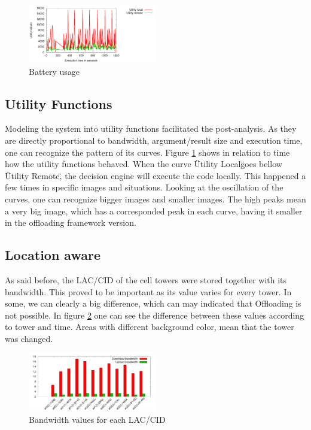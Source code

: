 \documentclass[10pt, conference, letterpaper]{IEEEtran}
\begin{document}
\begin{figure}[!t]
  \centering
  \includegraphics[width=0.5\textwidth]{results/plots/utility-fluctuation/executions.png}
  \caption{Battery usage}
  \label{fig:utilityplot}
\end{figure}

  \subsection{Utility Functions}
  Modeling the system into utility functions facilitated the post-analysis. As they are directly proportional to bandwidth, argument/result size and execution time, one can recognize the pattern of its curves. Figure \ref{fig:utilityplot} shows in relation to time how the utility functions behaved. When the curve \"Utility Local\" goes bellow \"Utility Remote\", the decision engine will execute the code locally. This happened a few times in specific images and situations. Looking at the oscillation of the curves, one can recognize bigger images and smaller images. The high peaks mean a very big image, which has a corresponded peak in each curve, having it smaller in the offloading framework version. 

  \subsection{Location aware}
  As said before, the LAC/CID of the cell towers were stored together with its bandwidth. This proved to be important as its value varies for every tower. In some, we can clearly a big difference, which can may indicated that Offloading is not possible. In figure \ref{fig:bwtime} one can see the difference between these values according to tower and time. Areas with different background color, mean that the tower was changed. 

\begin{figure}[!b]
  \centering
  \includegraphics[width=0.5\textwidth]{results/plots/laccid-bw/bars.png}
  \caption{Bandwidth values for each LAC/CID}
  \label{fig:bwtime}
\end{figure}
\end{document}
